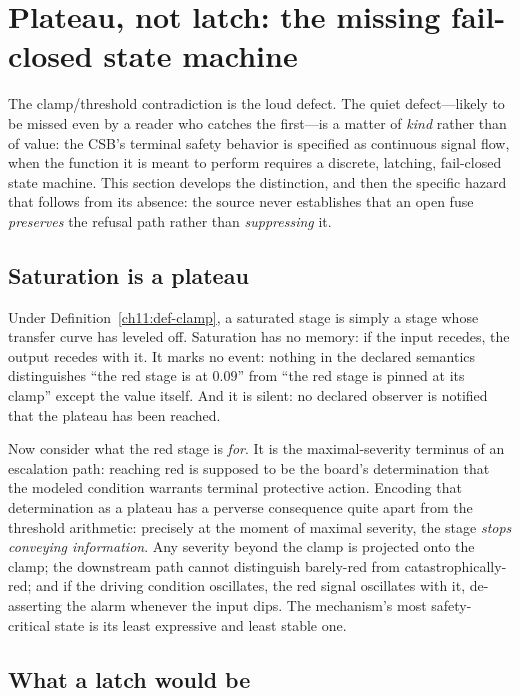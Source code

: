 \section{Plateau, not latch: the missing fail-closed state machine}\label{ch11:plateau}

The clamp/threshold contradiction is the loud defect. The quiet defect---likely to be missed even by a reader who catches the first---is a matter of \emph{kind} rather than of value: the CSB's terminal safety behavior is specified as continuous signal flow, when the function it is meant to perform requires a discrete, latching, fail-closed state machine. This section develops the distinction, and then the specific hazard that follows from its absence: the source never establishes that an open fuse \emph{preserves} the refusal path rather than \emph{suppressing} it.

\subsection{Saturation is a plateau}

Under Definition~\ref{ch11:def-clamp}, a saturated stage is simply a stage whose transfer curve has leveled off. Saturation has no memory: if the input recedes, the output recedes with it. It marks no event: nothing in the declared semantics distinguishes ``the red stage is at $0.09$'' from ``the red stage is pinned at its clamp'' except the value itself. And it is silent: no declared observer is notified that the plateau has been reached.

Now consider what the red stage is \emph{for}. It is the maximal-severity terminus of an escalation path: reaching red is supposed to be the board's determination that the modeled condition warrants terminal protective action. Encoding that determination as a plateau has a perverse consequence quite apart from the threshold arithmetic: precisely at the moment of maximal severity, the stage \emph{stops conveying information}. Any severity beyond the clamp is projected onto the clamp; the downstream path cannot distinguish barely-red from catastrophically-red; and if the driving condition oscillates, the red signal oscillates with it, de-asserting the alarm whenever the input dips. The mechanism's most safety-critical state is its least expressive and least stable one.

\subsection{What a latch would be}

